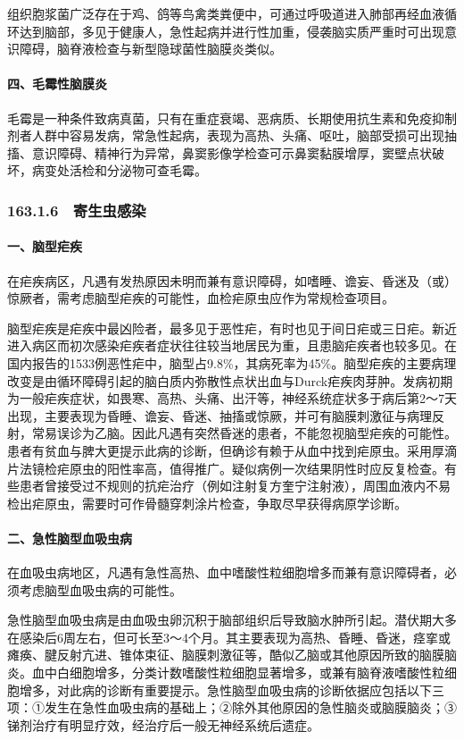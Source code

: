 组织胞浆菌广泛存在于鸡、鸽等鸟禽类粪便中，可通过呼吸道进入肺部再经血液循环达到脑部，多见于健康人，急性起病并进行性加重，侵袭脑实质严重时可出现意识障碍，脑脊液检查与新型隐球菌性脑膜炎类似。

\paragraph{四、毛霉性脑膜炎}

毛霉是一种条件致病真菌，只有在重症衰竭、恶病质、长期使用抗生素和免疫抑制剂者人群中容易发病，常急性起病，表现为高热、头痛、呕吐，脑部受损可出现抽搐、意识障碍、精神行为异常，鼻窦影像学检查可示鼻窦黏膜增厚，窦壁点状破坏，病变处活检和分泌物可查毛霉。

\subsubsection{163.1.6　寄生虫感染}

\paragraph{一、脑型疟疾}

在疟疾病区，凡遇有发热原因未明而兼有意识障碍，如嗜睡、谵妄、昏迷及（或）惊厥者，需考虑脑型疟疾的可能性，血检疟原虫应作为常规检查项目。

脑型疟疾是疟疾中最凶险者，最多见于恶性疟，有时也见于间日疟或三日疟。新近进入病区而初次感染疟疾者症状往往较当地居民为重，且患脑疟疾者也较多见。在国内报告的1533例恶性疟中，脑型占9.8\%，其病死率为45\%。脑型疟疾的主要病理改变是由循环障碍引起的脑白质内弥散性点状出血与Durck疟疾肉芽肿。发病初期为一般疟疾症状，如畏寒、高热、头痛、出汗等，神经系统症状多于病后第2～7天出现，主要表现为昏睡、谵妄、昏迷、抽搐或惊厥，并可有脑膜刺激征与病理反射，常易误诊为乙脑。因此凡遇有突然昏迷的患者，不能忽视脑型疟疾的可能性。患者有贫血与脾大更提示此病的诊断，但确诊有赖于从血中找到疟原虫。采用厚滴片法镜检疟原虫的阳性率高，值得推广。疑似病例一次结果阴性时应反复检查。有些患者曾接受过不规则的抗疟治疗（例如注射复方奎宁注射液），周围血液内不易检出疟原虫，需要时可作骨髓穿刺涂片检查，争取尽早获得病原学诊断。

\paragraph{二、急性脑型血吸虫病}

在血吸虫病地区，凡遇有急性高热、血中嗜酸性粒细胞增多而兼有意识障碍者，必须考虑脑型血吸虫病的可能性。

急性脑型血吸虫病是由血吸虫卵沉积于脑部组织后导致脑水肿所引起。潜伏期大多在感染后6周左右，但可长至3～4个月。其主要表现为高热、昏睡、昏迷，痉挛或瘫痪、腱反射亢进、锥体束征、脑膜刺激征等，酷似乙脑或其他原因所致的脑膜脑炎。血中白细胞增多，分类计数嗜酸性粒细胞显著增多，或兼有脑脊液嗜酸性粒细胞增多，对此病的诊断有重要提示。急性脑型血吸虫病的诊断依据应包括以下三项：①发生在急性血吸虫病的基础上；②除外其他原因的急性脑炎或脑膜脑炎；③锑剂治疗有明显疗效，经治疗后一般无神经系统后遗症。

